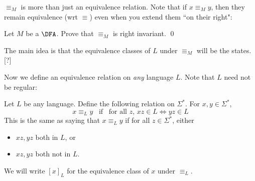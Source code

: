 $\equiv_M$ is more than just an equivalence relation. Note that if
$x \equiv_M y$, then they remain equivalence (wrt $\equiv$) even
when you extend them ``on their right":


\begin{ex}
Let $M$ be a $\DFA$. Prove that $\equiv_M$ is right invariant.
\qed
\end{ex}

The main idea is that the equivalence classes of $L$ under
$\equiv_M$ will be the states. [?]

Now we define an equivalence relation on \textit{any} language $L$.
Note that $L$ need not be regular:

\begin{defn}
  Let $L$ be any language.
  Define the following relation on $\Sigma^*$.
  For $x,y \in \Sigma^*$, 
  \[
  x \equiv_L y \,\,\, \text{ if } \,\,\,\text{for all $z$, } xz \in L
  \iff yz \in L
  \]  
  This is the same as saying that $x \equiv_L y$ if for all $z \in
  \Sigma^*$, either
  \begin{itemize}
  \item $xz, yz$ both in $L$, or
  \item $xz, yz$ both not in $L$.
  \end{itemize}
  
  We will write $[x]_L$ for the equivalence class of $x$ under
  $\equiv_L$.

\end{defn}



